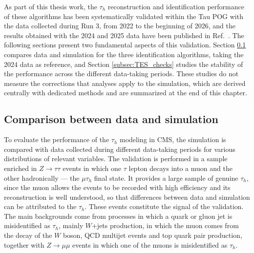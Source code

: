 As part of this thesis work, the $\tau_h$ reconstruction and identification performance of these algorithms has been systematically validated within the Tau POG with the data collected during Run 3, from 2022 to the beginning of 2026, and the results obtained with the 2024 and 2025 data have been published in Ref.~\cite{CMS-DP-2025-074}. The following sections present two fundamental aspects of this validation. Section \ref{subsec:Data-MC-agreement} compares data and simulation for the three identification algorithms, taking the 2024 data as reference, and Section \ref{subsec:TES_checks} studies the stability of the performance across the different data-taking periods. These studies do not measure the corrections that analyses apply to the simulation, which are derived centrally with dedicated methods and are summarized at the end of this chapter.


\subsection{Comparison between data and simulation}
\label{subsec:Data-MC-agreement}
%
To evaluate the performance of the $\tau_h$ modeling in CMS, the simulation is compared with data collected during different data-taking periods for various distributions of relevant variables. The validation is performed in a sample enriched in $Z\to\tau\tau$ events in which one $\tau$ lepton decays into a muon and the other hadronically — the $\mu\tau_h$ final state. It provides a large sample of genuine $\tau_h$, since the muon allows the events to be recorded with high efficiency and its reconstruction is well understood, so that differences between data and simulation can be attributed to the $\tau_h$. These events constitute the signal of the validation. The main backgrounds come from processes in which a quark or gluon jet is misidentified as $\tau_h$, mainly $W$+jets production, in which the muon comes from the decay of the $W$ boson, QCD multijet events and top quark pair production, together with $Z\to\mu\mu$ events in which one of the muons is misidentified as $\tau_h$.


